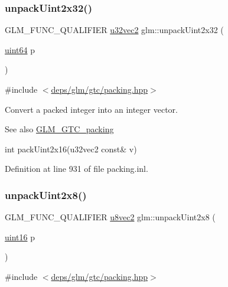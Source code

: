 \subsubsection{\texorpdfstring{unpack\+Uint2x32()}{unpackUint2x32()}}
{\footnotesize\ttfamily G\+L\+M\+\_\+\+F\+U\+N\+C\+\_\+\+Q\+U\+A\+L\+I\+F\+I\+ER \hyperlink{group__gtc__type__precision_gad854a1005ce84d8f6e8f05e42893f5c9}{u32vec2} glm\+::unpack\+Uint2x32 (\begin{DoxyParamCaption}\item[{\hyperlink{group__gtc__type__precision_gae3632bf9b37da66233d78930dd06378a}{uint64}}]{p }\end{DoxyParamCaption})}



{\ttfamily \#include $<$\hyperlink{gtc_2packing_8hpp}{deps/glm/gtc/packing.\+hpp}$>$}

Convert a packed integer into an integer vector.

\begin{DoxySeeAlso}{See also}
\hyperlink{group__gtc__packing}{G\+L\+M\+\_\+\+G\+T\+C\+\_\+packing} 

int pack\+Uint2x16(u32vec2 const\& v) 
\end{DoxySeeAlso}


Definition at line 931 of file packing.\+inl.

\mbox{\label{group__gtc__packing_ga060e0e7e299aa73ff869c197ebf44210}} 
\subsubsection{\texorpdfstring{unpack\+Uint2x8()}{unpackUint2x8()}}
{\footnotesize\ttfamily G\+L\+M\+\_\+\+F\+U\+N\+C\+\_\+\+Q\+U\+A\+L\+I\+F\+I\+ER \hyperlink{group__gtc__type__precision_ga01e28d0272428f94d22ea6111f0112be}{u8vec2} glm\+::unpack\+Uint2x8 (\begin{DoxyParamCaption}\item[{\hyperlink{group__gtc__type__precision_gad8c2939e1fdd8e5828b31d95c52255d5}{uint16}}]{p }\end{DoxyParamCaption})}



{\ttfamily \#include $<$\hyperlink{gtc_2packing_8hpp}{deps/glm/gtc/packing.\+hpp}$>$}


